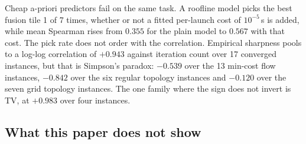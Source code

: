 Cheap a-priori predictors fail on the same task. A roofline model picks the
best fusion tile 1 of 7 times, whether or not a fitted per-launch cost of
$10^{-5}$\,s is added, while mean Spearman rises from $0.355$ for the plain
model to $0.567$ with that cost. The pick rate does not order with the
correlation.
Empirical sharpness pools to a log-log correlation of $+0.943$ against
iteration count over 17 converged instances, but that is Simpson's paradox:
$-0.539$ over the 13 min-cost flow instances, $-0.842$ over the six regular
topology instances and $-0.120$ over the seven grid topology instances. The one
family where the sign does not invert is TV, at $+0.983$ over four instances.

\subsection{What this paper does not show}
\label{sec:intro:limits}

